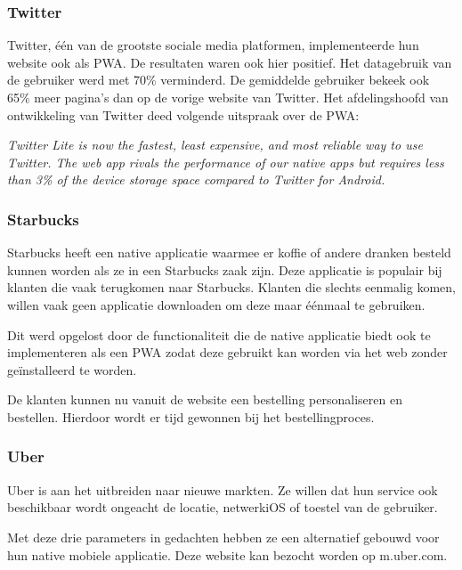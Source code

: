 	
	\subsubsection{Twitter}
	
		Twitter, één van de grootste sociale media platformen, implementeerde hun website ook als PWA. De resultaten waren ook hier positief. Het datagebruik van de gebruiker werd met 70\% verminderd. De gemiddelde gebruiker bekeek ook 65\% meer pagina's dan op de vorige website van Twitter.
		Het afdelingshoofd van ontwikkeling van Twitter deed volgende uitspraak over de PWA:
		
		\textit{Twitter Lite is now the fastest, least expensive, and most reliable way to use Twitter. The web app rivals the performance of our native apps but requires less than 3\% of the device storage space compared to Twitter for Android.}
		\autocite{Developers2020a}
		\autocite{Love2018}
	
	\subsubsection{Starbucks}
	
		Starbucks heeft een native applicatie waarmee er koffie of andere dranken besteld kunnen worden als ze in een Starbucks zaak zijn. Deze applicatie is populair bij klanten die vaak terugkomen naar Starbucks. Klanten die slechts eenmalig komen, willen vaak geen applicatie downloaden om deze maar éénmaal te gebruiken.
		
		Dit werd opgelost door de functionaliteit die de native applicatie biedt ook te implementeren als een PWA zodat deze gebruikt kan worden via het web zonder geïnstalleerd te worden.
		
		De klanten kunnen nu vanuit de website een bestelling personaliseren en bestellen. Hierdoor wordt er tijd gewonnen bij het bestellingproces.
		\autocite{Formidable2020}
		\autocite{Kawatka2020}
	
	\subsubsection{Uber}
	
		Uber is aan het uitbreiden naar nieuwe markten. Ze willen dat hun service ook beschikbaar wordt ongeacht de locatie, netwerkiOS of toestel van de gebruiker.
		
		Met deze drie parameters in gedachten hebben ze een alternatief gebouwd voor hun native mobiele applicatie. Deze website kan bezocht worden op m.uber.com.
		
